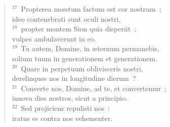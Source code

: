 \begin{flushleft}
\begin{verse}
${}^{17}$~Propterea mœstum factum est cor nostrum~;\\ ideo contenebrati sunt oculi nostri,\\
${}^{18}$~propter montem Sion quia disperiit~;\\ vulpes ambulaverunt in eo.\\
${}^{19}$~Tu autem, Domine, in \ae ternum permanebis,\\ solium tuum in generationem et generationem.\\
${}^{20}$~Quare in perpetuum oblivisceris nostri,\\ derelinques nos in longitudine dierum~?\\
${}^{21}$~Converte nos, Domine, ad te, et convertemur~;\\ innova dies nostros, sicut a principio.\\
${}^{22}$~Sed projiciens repulisti nos~:\\ iratus es contra nos vehementer.\end{verse}\end{flushleft}


